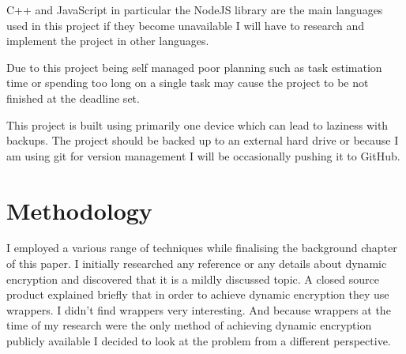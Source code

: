 
C++ and JavaScript in particular the NodeJS library are the main languages used in this project if they become unavailable I will have to research and implement the project in other languages.

Due to this project being self managed poor planning such as task estimation time or spending too long on a single task may cause the project to be not finished at the deadline set.

This project is built using primarily one device which can lead to laziness with backups. The project should be backed up to an external hard drive or because I am using git for version management I will be occasionally pushing it to GitHub.


\section{Methodology}


I employed a various range of techniques while finalising the background chapter of this paper. I initially researched any reference or any details about dynamic encryption and discovered that it is a mildly discussed topic. A closed source product explained briefly that in order to achieve dynamic encryption they use wrappers. I didn't find wrappers very interesting. And because wrappers at the time of my research were the only method of achieving dynamic encryption publicly available I decided to look at the problem from a different perspective.

